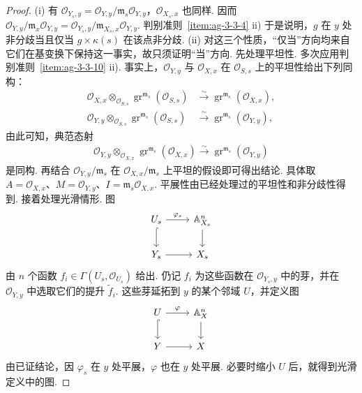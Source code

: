 \begin{proof}
\textup{(i)} 有 $\mathcal O_{Y_s,y}=\mathcal O_{Y,y}/\mathfrak m_s\mathcal O_{Y,y}$，$\mathcal O_{X_s,x}$ 也同样. 因而 $\mathcal O_{Y,y}/\mathfrak m_x\mathcal O_{Y,y}=\mathcal O_{Y_s,y}/\mathfrak m_{X_s,x}\mathcal O_{Y,y}$. 判别准则~\ref{item:ag-3-3-4} ii) 于是说明，$g$ 在 $y$ 处非分歧当且仅当 $g\times\kappa(s)$ 在该点非分歧.
\textup{(ii)} 对这三个性质，``仅当''方向均来自它们在基变换下保持这一事实，故只须证明``当''方向.
先处理平坦性. 多次应用判别准则~\ref{item:ag-3-3-10} ii). 事实上，$\mathcal O_{Y,y}$ 与 $\mathcal O_{X,x}$ 在 $\mathcal O_{S,s}$ 上的平坦性给出下列同构：
\begin{align*}
\mathcal O_{X,x}\otimes_{\mathcal O_{S,s}}\operatorname{gr}^{\mathfrak m_s}(\mathcal O_{S,s})&\xrightarrow\sim\operatorname{gr}^{\mathfrak m_s}(\mathcal O_{X,x}),\\
\mathcal O_{Y,y}\otimes_{\mathcal O_{S,s}}\operatorname{gr}^{\mathfrak m_s}(\mathcal O_{S,s})&\xrightarrow\sim\operatorname{gr}^{\mathfrak m_s}(\mathcal O_{Y,y}),
\end{align*}
由此可知，典范态射
\begin{align*}
\mathcal O_{Y,y}\otimes_{\mathcal O_{X,x}}\operatorname{gr}^{\mathfrak m_s}(\mathcal O_{X,x})\xrightarrow\sim\operatorname{gr}^{\mathfrak m_s}(\mathcal O_{Y,y})
\end{align*}
是同构. 再结合 $\mathcal O_{Y,y}/\mathfrak m_s$ 在 $\mathcal O_{X,x}/\mathfrak m_s$ 上平坦的假设即可得出结论. 具体取 $A=\mathcal O_{X,x}$、$M=\mathcal O_{Y,y}$、$I=\mathfrak m_s\mathcal O_{X,x}$.
平展性由已经处理过的平坦性和非分歧性得到.
接着处理光滑情形. 图
\begin{align*}
\begin{tikzcd}[ampersand replacement=\&]
U_s\arrow[r,"\varphi_s"]\arrow[d,hook] \& \mathbb A_{X_s}^n\arrow[d]\\
Y_s\arrow[r] \& X_s
\end{tikzcd}
\end{align*}
由 $n$ 个函数 $f_i\in\Gamma(U_s,\mathcal O_{U_s})$ 给出. 仍记 $f_i$ 为这些函数在 $\mathcal O_{Y_s,y}$ 中的芽，并在 $\mathcal O_{Y,y}$ 中选取它们的提升 $\widetilde f_i$. 这些芽延拓到 $y$ 的某个邻域 $U$，并定义图
\begin{align*}
\begin{tikzcd}[ampersand replacement=\&]
U\arrow[r,"\varphi"]\arrow[d,hook] \& \mathbb A_X^n\arrow[d]\\
Y\arrow[r] \& X
\end{tikzcd}
\end{align*}
由已证结论，因 $\varphi_s$ 在 $y$ 处平展，$\varphi$ 也在 $y$ 处平展. 必要时缩小 $U$ 后，就得到光滑定义中的图.
\end{proof}
